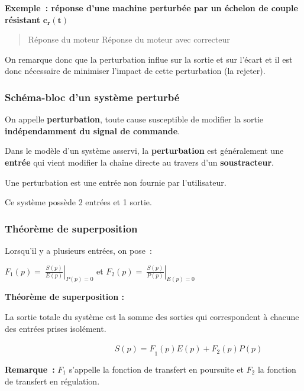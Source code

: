 \textbf{Exemple~: réponse d'une machine perturbée par un échelon de couple résistant} \(\mathbf{c}_{\mathbf{r}}\mathbf{(t)}\)

\begin{quote}
Réponse du moteur Réponse du moteur avec correcteur
\end{quote}

On remarque donc que la perturbation influe sur la sortie et sur l'écart et il est donc nécessaire de minimiser l'impact de cette perturbation (la rejeter).

\hypertarget{schuxe9ma-bloc-dun-systuxe8me-perturbuxe9}{%
\subsubsection{Schéma-bloc d'un système perturbé}\label{schuxe9ma-bloc-dun-systuxe8me-perturbuxe9}}

On appelle \textbf{perturbation}, toute cause susceptible de modifier la sortie \textbf{indépendamment du signal de commande}.

Dans le modèle d'un système asservi, la \textbf{perturbation} est généralement une \textbf{entrée} qui vient modifier la chaîne directe au travers d'un \textbf{soustracteur}.

Une perturbation est une entrée non fournie par l'utilisateur.

Ce système possède 2 entrées et 1 sortie.

\hypertarget{thuxe9oruxe8me-de-superposition}{%
\subsubsection{Théorème de superposition}\label{thuxe9oruxe8me-de-superposition}}

Lorsqu'il y a plusieurs entrées, on pose~:

\(F_{1}(p) = \left. \ \frac{S(p)}{E(p)} \right|_{P(p) = 0}\) et \(F_{2}(p) = \left. \ \frac{S(p)}{P(p)} \right|_{E(p) = 0}\)

\textbf{Théorème de superposition :}

La sortie totale du système est la somme des sorties qui correspondent à chacune des entrées prises isolément.

\(\ \ \ \ \ \ \ \ \ \ \ \ \ \ \ \ \ \ \ \ \ \ \ \ \ \ \ \ \ \ \ \ \ \ \ \ \ \ \ \ \ \ \ \ \ \ \ \ \ \ \ \ \ \ \ \ \ \ \ \ {S(p) = F}_{1}(p)E(p) + F_{2}(p)P(p)\)

\textbf{Remarque~:} \(F_{1}\) s'appelle la fonction de transfert en poursuite et \(F_{2}\) la fonction de transfert en régulation.

